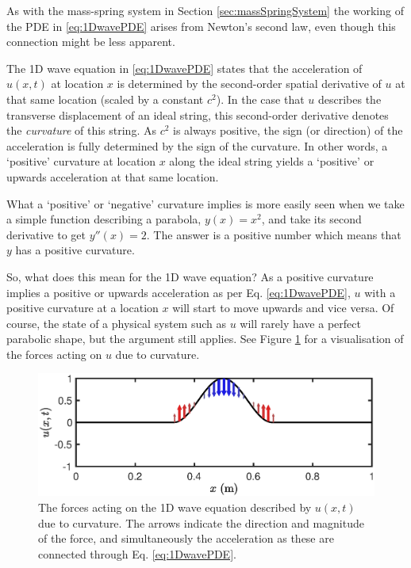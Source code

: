 

As with the mass-spring system in Section \ref{sec:massSpringSystem} the working of the PDE in \eqref{eq:1DwavePDE} arises from Newton's second law, even though this connection might be less apparent. %

The 1D wave equation in \eqref{eq:1DwavePDE} states that the acceleration of $u(x,t)$ at location $x$ is determined by the second-order spatial derivative of $u$ at that same location (scaled by a constant $c^2$). In the case that $u$ describes the transverse displacement of an ideal string, this second-order derivative denotes the \textit{curvature} of this string. As $c^2$ is always positive, the sign (or direction) of the acceleration is fully determined by the sign of the curvature. In other words, a `positive' curvature at location $x$ along the ideal string yields a `positive' or upwards acceleration at that same location. 

What a `positive' or `negative' curvature implies is more easily seen when we take a simple function describing a parabola, $y(x) = x^2$, and take its second derivative to get $y''(x) = 2$. The answer is a positive number which means that $y$ has a positive curvature. 

So, what does this mean for the 1D wave equation? As a positive curvature implies a positive or upwards acceleration as per Eq. \eqref{eq:1DwavePDE}, $u$ with a positive curvature at a location $x$ will start to move upwards and vice versa. Of course, the state of a physical system such as $u$ will rarely have a perfect parabolic shape, but the argument still applies. See Figure \ref{fig:curvature} for a visualisation of the forces acting on $u$ due to curvature.

\begin{figure}[h]
    \centering
    \includegraphics[width=\textwidth]{figures/fdtd/curvature.eps}
    \caption{\label{fig:curvature} The forces acting on the 1D wave equation described by $u(x,t)$ due to curvature. The arrows indicate the direction and magnitude of the force, and simultaneously the acceleration as these are connected through Eq. \eqref{eq:1DwavePDE}.}
\end{figure}

